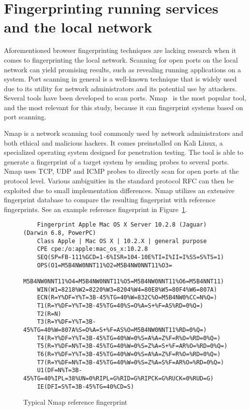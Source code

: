 \section{Fingerprinting running services and the local network}
Aforementioned browser fingerprinting techniques are lacking research when it comes to fingerprinting the local network. Scanning for open ports on the local network can yield promising results, such as revealing running applications on a system.
Port scanning in general is a well-known technique that is widely used due to its utility for network administrators and its potential use by attackers.
Several tools have been developed to scan ports. Nmap~ is the most popular tool, and the most relevant for this study, because it can fingerprint systems based on port scanning. 

Nmap is a network scanning tool commonly used by network administrators and both ethical and malicious hackers. It comes preinstalled on Kali Linux, a specialized operating system designed for penetration testing. The tool is able to generate a fingerprint of a target system by sending probes to several ports. Nmap uses TCP, UDP and ICMP probes to directly scan for open ports at the protocol level. Various ambiguities in the standard protocol RFC can
then be exploited due to small implementation differences.
Nmap utilizes an extensive fingerprint database to compare the resulting fingerprint with reference fingerprints. See an example reference fingerprint in Figure~\ref{fig:nmap-fingerprint}. 

\begin{figure}[H]
    \begin{verbatim}
    Fingerprint Apple Mac OS X Server 10.2.8 (Jaguar) (Darwin 6.8, PowerPC)
    Class Apple | Mac OS X | 10.2.X | general purpose
    CPE cpe:/o:apple:mac_os_x:10.2.8
    SEQ(SP=FB-111%GCD=1-6%ISR=104-10E%TI=I%II=I%SS=S%TS=1)
    OPS(O1=M5B4NW0NNT11%O2=M5B4NW0NNT11%O3=
    M5B4NW0NNT11%O4=M5B4NW0NNT11%O5=M5B4NW0NNT11%O6=M5B4NNT11)
    WIN(W1=8218%W2=8220%W3=8204%W4=80E8%W5=80F4%W6=807A)
    ECN(R=Y%DF=Y%T=3B-45%TG=40%W=832C%O=M5B4NW0%CC=N%Q=)
    T1(R=Y%DF=Y%T=3B-45%TG=40%S=O%A=S+%F=AS%RD=0%Q=)
    T2(R=N)
    T3(R=Y%DF=Y%T=3B-45%TG=40%W=807A%S=O%A=S+%F=AS%O=M5B4NW0NNT11%RD=0%Q=)
    T4(R=Y%DF=Y%T=3B-45%TG=40%W=0%S=A%A=Z%F=R%O=%RD=0%Q=)
    T5(R=Y%DF=N%T=3B-45%TG=40%W=0%S=Z%A=S+%F=AR%O=%RD=0%Q=)
    T6(R=Y%DF=Y%T=3B-45%TG=40%W=0%S=A%A=Z%F=R%O=%RD=0%Q=)
    T7(R=Y%DF=N%T=3B-45%TG=40%W=0%S=Z%A=S%F=AR%O=%RD=0%Q=)
    U1(DF=N%T=3B-45%TG=40%IPL=38%UN=0%RIPL=G%RID=G%RIPCK=G%RUCK=0%RUD=G)
    IE(DFI=S%T=3B-45%TG=40%CD=S)
    \end{verbatim}
    \caption{Typical Nmap reference fingerprint~\protect{}}
    \label{fig:nmap-fingerprint}
\end{figure}

